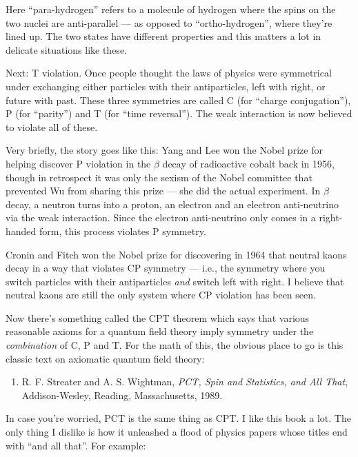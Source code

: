\documentclass{article}
\def\tightlist{}
\begin{document}
Here ``para-hydrogen'' refers to a molecule of hydrogen where the spins
on the two nuclei are anti-parallel --- as opposed to
``ortho-hydrogen'', where they're lined up. The two states have
different properties and this matters a lot in delicate situations like
these.

Next: T violation. Once people thought the laws of physics were
symmetrical under exchanging either particles with their antiparticles,
left with right, or future with past. These three symmetries are called
C (for ``charge conjugation''), P (for ``parity'') and T (for ``time
reversal''). The weak interaction is now believed to violate all of
these.

Very briefly, the story goes like this: Yang and Lee won the Nobel prize
for helping discover P violation in the \(\beta\) decay of radioactive
cobalt back in 1956, though in retrospect it was only the sexism of the
Nobel committee that prevented Wu from sharing this prize --- she did
the actual experiment. In \(\beta\) decay, a neutron turns into a
proton, an electron and an electron anti-neutrino via the weak
interaction. Since the electron anti-neutrino only comes in a
right-handed form, this process violates P symmetry.

Cronin and Fitch won the Nobel prize for discovering in 1964 that
neutral kaons decay in a way that violates CP symmetry --- i.e., the
symmetry where you switch particles with their antiparticles \emph{and}
switch left with right. I believe that neutral kaons are still the only
system where CP violation has been seen.

Now there's something called the CPT theorem which says that various
reasonable axioms for a quantum field theory imply symmetry under the
\emph{combination} of C, P and T. For the math of this, the obvious
place to go is this classic text on axiomatic quantum field theory:

\begin{enumerate}
\def\labelenumi{\arabic{enumi})}
\setcounter{enumi}{8}
\tightlist
\item
  R. F. Streater and A. S. Wightman, \emph{PCT, Spin and Statistics, and
  All That}, Addison-Wesley, Reading, Massachusetts, 1989.
\end{enumerate}

In case you're worried, PCT is the same thing as CPT. I like this book a
lot. The only thing I dislike is how it unleashed a flood of physics
papers whose titles end with ``and all that''. For example:
\end{document}

